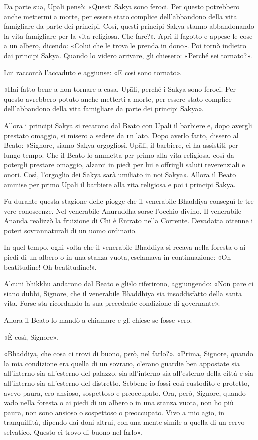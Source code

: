 Da parte sua, Upāli pensò: «Questi Sakya sono feroci. Per questo potrebbero
anche mettermi a morte, per essere stato complice dell’abbandono della vita
famigliare da parte dei principi. Così, questi principi Sakya stanno
abbandonando la vita famigliare per la vita religiosa. Che fare?». Aprì il
fagotto e appese le cose a un albero, dicendo: «Colui che le trova le prenda in
dono». Poi tornò indietro dai principi Sakya. Quando lo videro arrivare, gli
chiesero: «Perché sei tornato?».

Lui raccontò l’accaduto e aggiunse: «E così sono tornato».

«Hai fatto bene a non tornare a casa, Upāli, perché i Sakya sono feroci. Per
questo avrebbero potuto anche metterti a morte, per essere stato complice
dell’abbandono della vita famigliare da parte dei principi Sakya».

Allora i principi Sakya si recarono dal Beato con Upāli il barbiere e, dopo
avergli prestato omaggio, si misero a sedere da un lato. Dopo averlo fatto,
dissero al Beato: «Signore, siamo Sakya orgogliosi. Upāli, il barbiere, ci ha
assistiti per lungo tempo. Che il Beato lo ammetta per primo alla vita
religiosa, così da potergli prestare omaggio, alzarci in piedi per lui e
offrirgli saluti reverenziali e onori. Così, l’orgoglio dei Sakya sarà umiliato
in noi Sakya». Allora il Beato ammise per primo Upāli il barbiere alla vita
religiosa e poi i principi Sakya.

Fu durante questa stagione delle piogge che il venerabile Bhaddiya conseguì le
tre vere conoscenze. Nel venerabile Anuruddha sorse l’occhio divino. Il
venerabile Ānanda realizzò la fruizione di Chi è Entrato nella Corrente.
Devadatta ottenne i poteri sovrannaturali di un uomo ordinario.

In quel tempo, ogni volta che il venerabile Bhaddiya si recava nella foresta o
ai piedi di un albero o in una stanza vuota, esclamava in continuazione: «Oh
beatitudine! Oh beatitudine!».

Alcuni bhikkhu andarono dal Beato e glielo riferirono, aggiungendo: «Non pare ci
siano dubbi, Signore, che il venerabile Bhaddhiya sia insoddisfatto della santa
vita. Forse sta ricordando la sua precedente condizione di governante».

Allora il Beato lo mandò a chiamare e gli chiese se fosse vero.

«È così, Signore».

«Bhaddiya, che cosa ci trovi di buono, però, nel farlo?». «Prima, Signore,
quando la mia condizione era quella di un sovrano, c’erano guardie ben appostate
sia all’interno sia all’esterno del palazzo, sia all’interno sia all’esterno
della città e sia all’interno sia all’esterno del distretto. Sebbene io fossi
così custodito e protetto, avevo paura, ero ansioso, sospettoso e preoccupato.
Ora, però, Signore, quando vado nella foresta o ai piedi di un albero o in una
stanza vuota, non ho più paura, non sono ansioso o sospettoso o preoccupato.
Vivo a mio agio, in tranquillità, dipendo dai doni altrui, con una mente simile
a quella di un cervo selvatico. Questo ci trovo di buono nel farlo».

